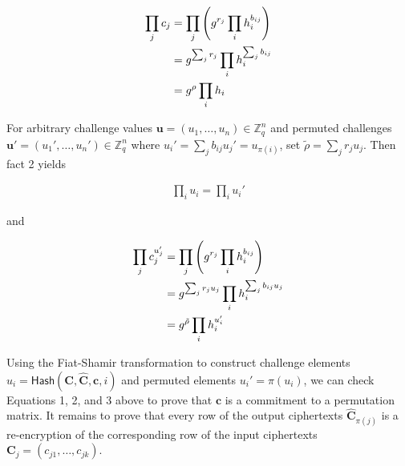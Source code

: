 \documentclass[12pt,a4paper]{article}
\theoremstyle{definition}
\begin{document}
\begin{align}
\prod_j c_j &= \prod_j \left(g^{r_j}\prod_i h_i^{b_{ij}}\right)\notag\\
            &= g^{\sum_j r_j}\prod_i h_i^{\sum_j b_{ij}}\notag\\
            &= g^\rho\prod_i h_i \label{wikstrom-1}
\end{align}

For arbitrary challenge values $\mathbf{u}=(u_1, \ldots, u_n)\in\mathbb{Z}_q^n$ and permuted challenges $\mathbf{u'}=(u_1',\ldots,u_n')\in\mathbb{Z}_q^n$ where $u_i' = \sum_j b_{ij} u_j' = u_{\pi(i)}$, set $\tilde{\rho}=\sum_j r_j u_j$. Then fact 2 yields

\begin{align}
    \prod_i u_i = \prod_i u_i' \label{wikstrom-2}
\end{align}

and

\begin{align}
    \prod_j c_j^{u_j'}   &= \prod_j\left(g^{r_j}\prod_i h_i^{b_{ij}}\right)\notag\\    
                        &= g^{\sum_j r_j u_j}\prod_i h_i^{\sum_j b_{ij} u_j}\notag\\
                        &= g^{\tilde{\rho}} \prod_i h_i^{u_i'} \label{wikstrom-3}
\end{align}

Using the Fiat-Shamir transformation to construct challenge elements \\ $u_i=\mathsf{Hash}(\mathbf{C}, \mathbf{\hat{C}}, \mathbf{c}, i)$ and permuted elements $u_i'=\pi(u_i)$, we can check Equations 1, 2, and 3 above to prove that $\mathbf{c}$ is a commitment to a permutation matrix. It remains to prove that every row of the output ciphertexts $\mathbf{\hat{C}}_{\pi(j)}$ is a re-encryption of the corresponding row of the input ciphertexts $\mathbf{C}_j=(c_{j1},\ldots,c_{jk})$.
\end{document}

